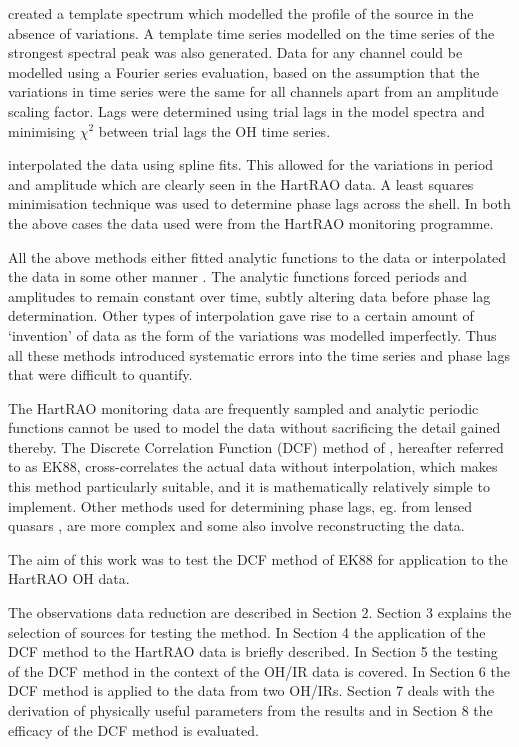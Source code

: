 \documentclass[usenatbib,usegraphicx]{mn2e}
\begin{document}
\citet{Shepherd91} created a template spectrum which modelled the profile
of the source in the absence of variations.  A template time series modelled
on the time series of the strongest spectral peak was also generated.  Data
for any channel could be modelled using a Fourier series evaluation, based
on the assumption that the variations in time series were the same for all
channels apart from an amplitude scaling factor. 
Lags were determined using trial lags in the model spectra and minimising
$\chi^2$ between trial lags the OH time series.  

\citet{West92} interpolated the data using spline fits.  This allowed for
the variations in period and amplitude which are clearly seen in the HartRAO
data.  A least squares minimisation technique was used to determine phase
lags across the shell.  In both the above cases the data used were from the
HartRAO monitoring programme.

All the above methods either fitted analytic functions to the data
\citep[eg.][]{Herman83,HerHab85} or interpolated the data in some other
manner \citep[eg.][]{vLvdHvS90,Shepherd91,West92}.  The analytic functions
forced periods and amplitudes to remain constant over time, subtly altering
data before phase lag determination.  Other types of interpolation gave rise
to a certain amount of `invention' of data \citep{EK88} as the form of the
variations was modelled imperfectly.  Thus all these methods introduced
systematic errors into the time series and phase lags that were difficult to
quantify.

The HartRAO monitoring data are frequently sampled and analytic periodic
functions cannot be used to model the data without sacrificing the detail
gained thereby.  The Discrete Correlation Function (DCF)
method of \citet{EK88}, hereafter referred to as EK88, cross-correlates the
actual data without interpolation, which makes this method particularly
suitable, and it is mathematically relatively simple to implement.  Other
methods used for determining phase lags, eg. from lensed quasars
\citep[eg.][]{PhLPelt96,PhLPress92}, are more complex and some also involve
reconstructing the data.

The aim of this work was to test the DCF method of EK88 for application to
the HartRAO OH data.

The observations data reduction are described in Section 2.  Section 3
explains the selection of sources for testing the method.  In Section 4 the
application of the DCF method to the HartRAO data is briefly described.  In
Section 5 the testing of the DCF method in the context of the OH/IR data is
covered.  In Section 6 the DCF method is applied to the data from two
OH/IRs.  Section 7 deals with the derivation of physically useful parameters
from the results and in Section 8 the efficacy of the DCF method is evaluated.
\end{document}

